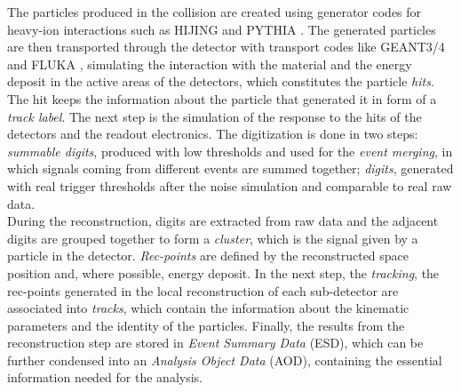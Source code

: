 The particles produced in the collision are created using generator codes for heavy-ion interactions such as HIJING \cite{hijing} and PYTHIA \cite{pythia}. The generated particles are  then transported through the detector with transport codes like GEANT3/4 \cite{geant} and FLUKA \cite{fluka}, simulating the interaction with the material and the energy deposit in the active areas of the detectors, which constitutes the particle \textit{hits}. The hit keeps the information about the particle that generated it in form of a \textit{track label}. The next step is the simulation of the response to the hits of the detectors and the readout electronics. The digitization is done in two steps: \textit{summable digits}, produced with low thresholds and used for the \textit{event merging}, in which signals coming from different events are summed together; \textit{digits}, generated with real trigger thresholds after the noise simulation and comparable to real raw data.\\
During the reconstruction, digits are extracted from raw data and the adjacent digits are grouped together to form  a \textit{cluster}, which is the signal given by a particle in the detector. \textit{Rec-points} are defined by the reconstructed space position and, where possible, energy deposit. In the next step, the \textit{tracking}, the rec-points generated in the local reconstruction of each sub-detector are associated into \textit{tracks}, which contain the information about the kinematic parameters and the identity of the particles. Finally, the results from the reconstruction step are stored in \textit{Event Summary Data} (ESD), which can be further condensed into an \textit{Analysis Object Data} (AOD), containing the essential information needed for the analysis.
